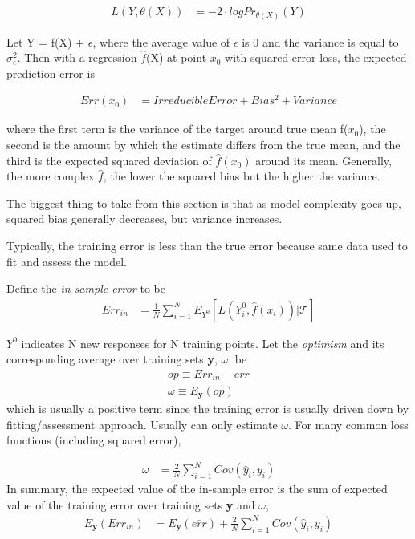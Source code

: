 \documentclass[11pt]{labbook}
\newcommand{\Loss}[2]{L\left(#1,#2\right)}
\begin{document}
\begin{align*}
\Loss{Y}{\theta(X)} &= -2 \cdot logPr_{\theta\left(X\right)}(Y)
\end{align*}

Let Y = f(X) + $\epsilon$, where the average value of $\epsilon$ is 0 and the variance is equal to $\sigma_\epsilon^2$. Then with a regression $\hat{f}$(X) at point $x_0$ with squared error loss, the expected prediction error is 

\begin{align*}
Err(x_0) &= Irreducible Error + Bias^2 + Variance
\end{align*}

where the first term is the variance of the target around true mean f($x_0$), the second is the amount by which the estimate differs from the true mean, and the third is the expected squared deviation of $\hat{f}(x_0)$ around its mean. Generally, the more complex $\hat{f}$, the lower the squared bias but the higher the variance. 

The biggest thing to take from this section is that as model complexity goes up, squared bias generally decreases, but variance increases. 


Typically, the training error is less than the true error because same data used to fit and assess the model. 

Define the \textit{in-sample error} to be
\begin{align*}
Err_{in} &= \frac{1}{N}\sum_{i=1}^{N}E_{Y^0}\left[\Loss{Y_i^0}{\hat{f}(x_i)}|\mathcal{T}\right]
\end{align*}

$Y^0$ indicates N new responses for N training points. Let the \textit{optimism} and its corresponding average over training sets \textbf{y}, $\omega$, be
\begin{align*}
op \equiv Err_{in} -\overline{err} \\
\omega \equiv E_{\textbf{y}}(op)
\end{align*}
which is usually a positive term since the training error is usually driven down by fitting/assessment approach. Usually can only estimate $\omega$. For many common loss functions (including squared error),

\begin{align*}
\omega &= \frac{2}{N}\sum_{i=1}^{N}Cov\left(\hat{y}_i,y_i\right)
\end{align*}
In summary, the expected value of the in-sample error is the sum of expected value of the training error over training sets \textbf{y} and $\omega$,
\begin{align*}
 E_{\textbf{y}}(Err_{in}) &= E_{\textbf{y}}(\overline{err}) + \frac{2}{N}\sum_{i=1}^{N}Cov\left(\hat{y}_i,y_i\right)
\end{align*}   
\end{document}
